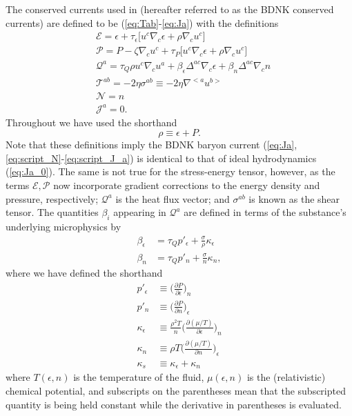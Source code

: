 \documentclass[%
notitlepage,
superscriptaddress,
nofootinbib,
amsmath,
amssymb,
aps,
twocolumn
]{revtex4-1}
\begin{document}
The conserved currents used in \cite{Bemfica:2020zjp} (hereafter referred to as the BDNK conserved currents) are defined to be (\ref{eq:Tab}-\ref{eq:Ja}) with the definitions
\begin{align}
&\mathcal{E} = \epsilon + \tau_{\epsilon} \big[ u^c \nabla_c \epsilon + \rho \nabla_c u^c \big] \label{eq:script_E} \\
&\mathcal{P} = P - \zeta \nabla_c u^c + \tau_{P} \big[ u^c \nabla_c \epsilon + \rho \nabla_c u^c \big] \label{eq:script_P} \\
&\mathcal{Q}^{a} = \tau_{Q} \rho u^c \nabla_c u^a + \beta_{\epsilon} \Delta^{a c} \nabla_c \epsilon + \beta_{n} \Delta^{a c} \nabla_c n \label{eq:Q_a}\\
&\mathcal{T}^{ab} = - 2 \eta \sigma^{ab} \equiv -2 \eta \nabla^{<a} u^{b>} \label{eq:script_T_ab} \\
&\mathcal{N} = n \label{eq:script_N}\\
&\mathcal{J}^{a} = 0. \label{eq:script_J_a}
\end{align}
Throughout we have used the shorthand
\begin{equation} \label{eq:rho}
\rho \equiv \epsilon + P.
\end{equation}
Note that these definitions imply the BDNK baryon current (\ref{eq:Ja}, \ref{eq:script_N}-\ref{eq:script_J_a}) is identical to that of ideal hydrodynamics (\ref{eq:Ja_0}).  The same is not true for the stress-energy tensor, however, as the terms $\mathcal{E}, \mathcal{P}$ now incorporate gradient corrections to the energy density and pressure, respectively; $\mathcal{Q}^{a}$ is the heat flux vector; and $\sigma^{ab}$ is known as the shear tensor.  The quantities $\beta_{i}$ appearing in $\mathcal{Q}^{a}$ are defined in terms of the substance's underlying microphysics by 
\begin{align}
\beta_{\epsilon} &= \tau_{Q} p'_{\epsilon} + \frac{\sigma}{\rho} \kappa_{\epsilon} \label{eq:beta_eps} \\
\beta_{n} &= \tau_{Q} p'_{n} + \frac{\sigma}{n} \kappa_{n}, \label{eq:beta_n}
\end{align}
where we have defined the shorthand
\begin{align}
p'_{\epsilon} &\equiv \Big( \frac{\partial P}{\partial \epsilon} \Big)_{n} \label{eq:pPeps_defn}\\
p'_{n} &\equiv \Big( \frac{\partial P}{\partial n} \Big)_{\epsilon} \\
\kappa_{\epsilon} &\equiv \frac{\rho^2 T}{n} \Big( \frac{\partial (\mu/T)}{\partial \epsilon} \Big)_{n} \\
\kappa_{n} &\equiv \rho T\Big( \frac{\partial (\mu/T)}{\partial n} \Big)_{\epsilon} \label{eq:kappa_n_defn} \\
\kappa_{s} &\equiv \kappa_{\epsilon} + \kappa_{n} \label{eq:kappa_s}
\end{align}
where $T(\epsilon, n)$ is the temperature of the fluid, $\mu(\epsilon, n)$ is the (relativistic) chemical potential, and subscripts on the parentheses mean that the subscripted quantity is being held constant while the derivative in parentheses is evaluated.
\end{document}
